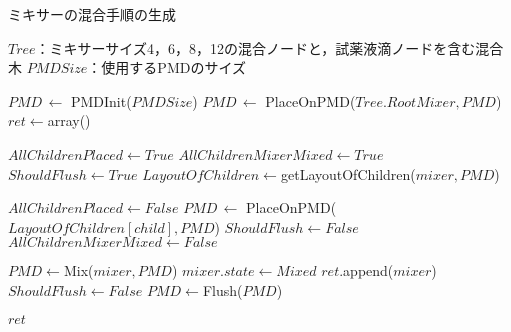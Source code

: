 \begin{algorithm}[tbp]
 \caption{ミキサーの混合手順の生成}\label{alg:genMixingProcedure}
 \begin{algorithmic}[1]
     \Require $\mathit{Tree}$：ミキサーサイズ4，6，8，12の混合ノードと，試薬液滴ノードを含む混合木 
     \Require $\mathit{PMDSize}$：使用するPMDのサイズ

     \State $\mathit{PMD}\,\gets $  PMDInit($\mathit{PMDSize}$)
     \State $\mathit{PMD}\,\gets $  PlaceOnPMD($\mathit{Tree.RootMixer,PMD}$)
     \State $\mathit{ret} \gets $array() 

    \State {}
        \State $\mathit{AllChildrenPlaced}\gets\mathit{True}$
        \State $\mathit{AllChildrenMixerMixed}\gets\mathit{True}$
        \State $\mathit{ShouldFlush}\gets\mathit{True}$
        \State $\mathit{LayoutOfChildren}\gets$getLayoutOfChildren($\mathit{mixer,PMD}$) 

                \State$\mathit{AllChildrenPlaced \gets False}$
                \State $\mathit{PMD}\, \gets$  PlaceOnPMD($\mathit{LayoutOfChildren[child],PMD}$) 
                \State $\mathit{ShouldFlush}\gets\mathit{False}$
            \EndIf 
                \State $\mathit{AllChildrenMixerMixed}\gets\mathit{False}$
            \EndIf 
        \EndFor 

            \State$\mathit{PMD}\gets$Mix($\mathit{mixer,PMD}$)
            \State$\mathit{mixer.state} \gets \mathit{Mixed}$ 
            \State$\mathit{ret} $.append($\mathit{mixer}$) 
            \State $\mathit{ShouldFlush}\gets\mathit{False}$
        \EndIf
        \EndFor 
                    \State $\mathit{PMD}\gets$Flush($\mathit{PMD}$)
                \EndIf
    \EndWhile 

     \Return $\mathit{ret}$
     \EndFunction
 \end{algorithmic}
\end{algorithm}

